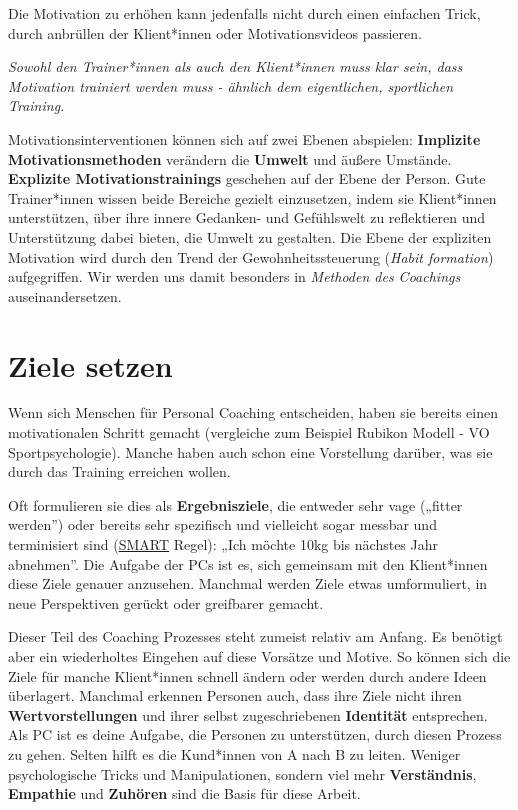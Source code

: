 \documentclass[
  letterpaper,
  DIV=11,
  numbers=noendperiod]{scrreprt}
\begin{document}
Die Motivation zu erhöhen kann jedenfalls nicht durch einen einfachen
Trick, durch anbrüllen der Klient*innen oder Motivationsvideos
passieren.

\emph{Sowohl den Trainer*innen als auch den Klient*innen muss klar sein,
dass Motivation trainiert werden muss - ähnlich dem eigentlichen,
sportlichen Training.}

Motivationsinterventionen können sich auf zwei Ebenen abspielen:
\textbf{Implizite Motivationsmethoden} verändern die \textbf{Umwelt} und
äußere Umstände. \textbf{Explizite Motivationstrainings} geschehen auf
der Ebene der Person. Gute Trainer*innen wissen beide Bereiche gezielt
einzusetzen, indem sie Klient*innen unterstützen, über ihre innere
Gedanken- und Gefühlswelt zu reflektieren und Unterstützung dabei
bieten, die Umwelt zu gestalten. Die Ebene der expliziten Motivation
wird durch den Trend der Gewohnheitssteuerung (\emph{Habit formation})
aufgegriffen. Wir werden uns damit besonders in \emph{Methoden des
Coachings} auseinandersetzen.

\section{Ziele setzen}\label{ziele-setzen}

Wenn sich Menschen für Personal Coaching entscheiden, haben sie bereits
einen motivationalen Schritt gemacht (vergleiche zum Beispiel Rubikon
Modell - VO Sportpsychologie). Manche haben auch schon eine Vorstellung
darüber, was sie durch das Training erreichen wollen.

Oft formulieren sie dies als \textbf{Ergebnisziele}, die entweder sehr
vage („fitter werden'') oder bereits sehr spezifisch und vielleicht
sogar messbar und terminisiert sind
(\href{https://de.wikipedia.org/wiki/SMART_(Projektmanagement)}{SMART}
Regel): „Ich möchte 10kg bis nächstes Jahr abnehmen''. Die Aufgabe der
PCs ist es, sich gemeinsam mit den Klient*innen diese Ziele genauer
anzusehen. Manchmal werden Ziele etwas umformuliert, in neue
Perspektiven gerückt oder greifbarer gemacht.

Dieser Teil des Coaching Prozesses steht zumeist relativ am Anfang. Es
benötigt aber ein wiederholtes Eingehen auf diese Vorsätze und Motive.
So können sich die Ziele für manche Klient*innen schnell ändern oder
werden durch andere Ideen überlagert. Manchmal erkennen Personen auch,
dass ihre Ziele nicht ihren \textbf{Wertvorstellungen} und ihrer selbst
zugeschriebenen \textbf{Identität} entsprechen. Als PC ist es deine
Aufgabe, die Personen zu unterstützen, durch diesen Prozess zu gehen.
Selten hilft es die Kund*innen von A nach B zu leiten. Weniger
psychologische Tricks und Manipulationen, sondern viel mehr
\textbf{Verständnis}, \textbf{Empathie} und \textbf{Zuhören} sind die
Basis für diese Arbeit.
\end{document}
